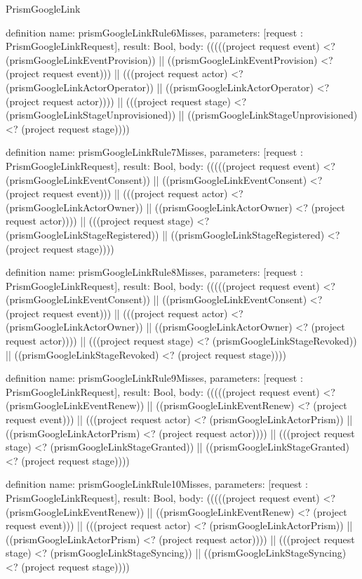 \begin{lexlean}{PrismGoogleLink}
\begin{semanticmodule}
definition{
  name: prismGoogleLinkRule6Misses,
  parameters: [request : PrismGoogleLinkRequest],
  result: Bool,
  body: (((((project request event) <? (prismGoogleLinkEventProvision)) || ((prismGoogleLinkEventProvision) <? (project request event))) || (((project request actor) <? (prismGoogleLinkActorOperator)) || ((prismGoogleLinkActorOperator) <? (project request actor)))) || (((project request stage) <? (prismGoogleLinkStageUnprovisioned)) || ((prismGoogleLinkStageUnprovisioned) <? (project request stage))))
}

definition{
  name: prismGoogleLinkRule7Misses,
  parameters: [request : PrismGoogleLinkRequest],
  result: Bool,
  body: (((((project request event) <? (prismGoogleLinkEventConsent)) || ((prismGoogleLinkEventConsent) <? (project request event))) || (((project request actor) <? (prismGoogleLinkActorOwner)) || ((prismGoogleLinkActorOwner) <? (project request actor)))) || (((project request stage) <? (prismGoogleLinkStageRegistered)) || ((prismGoogleLinkStageRegistered) <? (project request stage))))
}

definition{
  name: prismGoogleLinkRule8Misses,
  parameters: [request : PrismGoogleLinkRequest],
  result: Bool,
  body: (((((project request event) <? (prismGoogleLinkEventConsent)) || ((prismGoogleLinkEventConsent) <? (project request event))) || (((project request actor) <? (prismGoogleLinkActorOwner)) || ((prismGoogleLinkActorOwner) <? (project request actor)))) || (((project request stage) <? (prismGoogleLinkStageRevoked)) || ((prismGoogleLinkStageRevoked) <? (project request stage))))
}

definition{
  name: prismGoogleLinkRule9Misses,
  parameters: [request : PrismGoogleLinkRequest],
  result: Bool,
  body: (((((project request event) <? (prismGoogleLinkEventRenew)) || ((prismGoogleLinkEventRenew) <? (project request event))) || (((project request actor) <? (prismGoogleLinkActorPrism)) || ((prismGoogleLinkActorPrism) <? (project request actor)))) || (((project request stage) <? (prismGoogleLinkStageGranted)) || ((prismGoogleLinkStageGranted) <? (project request stage))))
}

definition{
  name: prismGoogleLinkRule10Misses,
  parameters: [request : PrismGoogleLinkRequest],
  result: Bool,
  body: (((((project request event) <? (prismGoogleLinkEventRenew)) || ((prismGoogleLinkEventRenew) <? (project request event))) || (((project request actor) <? (prismGoogleLinkActorPrism)) || ((prismGoogleLinkActorPrism) <? (project request actor)))) || (((project request stage) <? (prismGoogleLinkStageSyncing)) || ((prismGoogleLinkStageSyncing) <? (project request stage))))
}


\end{semanticmodule}
\end{lexlean}
